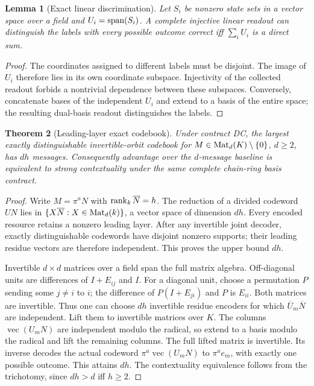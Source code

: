 \documentclass[11pt]{article}
\newtheorem{theorem}{Theorem}[section]
\newtheorem{lemma}[theorem]{Lemma}
\theoremstyle{remark}
\begin{document}
\begin{lemma}[Exact linear discrimination]
Let $S_i$ be nonzero state sets in a vector space over a field and
$U_i=\operatorname{span}(S_i)$. A complete injective linear readout can distinguish the labels
with every possible outcome correct iff $\sum_i U_i$ is a direct sum.
\end{lemma}
\begin{proof}
The coordinates assigned to different labels must be disjoint. The image of
$U_i$ therefore lies in its own coordinate subspace. Injectivity of the collected
readout forbids a nontrivial dependence between these subspaces. Conversely,
concatenate bases of the independent $U_i$ and extend to a basis of the entire
space; the resulting dual-basis readout distinguishes the labels.
\end{proof}

\begin{theorem}[Leading-layer exact codebook]
Under contract DC, the largest exactly distinguishable invertible-orbit
codebook for $M\in\operatorname{Mat}_d(K)\setminus\{0\}$, $d\geq2$, has $d h$ messages.
Consequently advantage over the $d$-message baseline is equivalent to strong
contextuality under the same complete chain-ring basis contract.
\end{theorem}
\begin{proof}
Write $M=\pi^a N$ with $\operatorname{rank}_k\overline N=h$. The reduction of a divided
codeword $UN$ lies in
$\{X\overline N:X\in\operatorname{Mat}_d(k)\}$, a vector space of dimension $dh$.
Every encoded resource retains a nonzero leading layer. After any invertible
joint decoder, exactly distinguishable codewords have disjoint nonzero supports;
their leading residue vectors are therefore independent. This proves the upper
bound $dh$.

Invertible $d\times d$ matrices over a field span the full matrix algebra.
Off-diagonal units are differences of $I+E_{ij}$ and $I$. For a diagonal unit,
choose a permutation $P$ sending some $j\ne i$ to $i$; the difference of
$P(I+E_{ji})$ and $P$ is $E_{ii}$. Both matrices are invertible.
Thus one can choose $dh$ invertible residue encoders for which
$\overline U_m\overline N$ are independent. Lift them to invertible matrices
over $K$. The columns $\operatorname{vec}(U_mN)$ are independent modulo the
radical, so extend to a basis modulo the radical and lift the remaining columns.
The full lifted matrix is invertible. Its inverse decodes the actual codeword
$\pi^a\operatorname{vec}(U_mN)$ to $\pi^a e_m$, with exactly one possible
outcome. This attains $dh$. The contextuality equivalence follows from the
trichotomy, since $dh>d$ iff $h\geq2$.
\end{proof}
\end{document}
